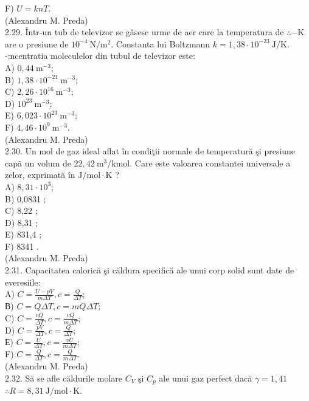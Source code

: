 F) $U=k n T$.\\
(Alexandru M. Preda)\\
2.29. Într-un tub de televizor se gǎsesc urme de aer care la temperatura de $\therefore-\mathrm{K}$ are o presiune de $10^{-4} \mathrm{~N} / \mathrm{m}^{2}$. Constanta lui Boltzmann $k=1,38 \cdot 10^{-23} \mathrm{~J} / \mathrm{K}$. -:ncentratia moleculelor din tubul de televizor este:\\
A) $0,44 \mathrm{~m}^{-3}$;\\
B) $1,38 \cdot 10^{-21} \mathrm{~m}^{-3}$;\\
C) $2,26 \cdot 10^{16} \mathrm{~m}^{-3}$;\\
D) $10^{23} \mathrm{~m}^{-3}$;\\
E) $6,023 \cdot 10^{23} \mathrm{~m}^{-3}$;\\
F) $4,46 \cdot 10^{9} \mathrm{~m}^{-3}$.\\
(Alexandru M. Preda)\\
2.30. Un mol de gaz ideal aflat în condiţii normale de temperatură şi presiune capã un volum de $22,42 \mathrm{~m}^{3} / \mathrm{kmol}$. Care este valoarea constantei universale a zelor, exprimată în $\mathrm{J} / \mathrm{mol} \cdot \mathrm{K}$ ?\\
A) $8,31 \cdot 10^{3}$;\\
B) 0,0831 ;\\
C) 8,22 ;\\
D) 8,31 ;\\
E) 831,4 ;\\
F) 8341 .\\
(Alexandru M. Preda)\\
2.31. Capacitatea calorică şi căldura specifică ale unui corp solid sunt date de everesiile:\\
A) $C=\frac{U-p V}{m \Delta T}, c=\frac{Q}{\Delta T}$;\\
В) $C=Q \Delta T, c=m Q \Delta T$;\\
C) $C=\frac{v Q}{\Delta T}, c=\frac{v Q}{m \Delta T}$;\\
D) $C=\frac{p V}{\Delta T}, c=\frac{Q}{\Delta T}$;\\
Е) $C=\frac{U}{\Delta T}, c=\frac{v U}{m \Delta T}$;\\
F) $C=\frac{Q}{\Delta T}, c=\frac{Q}{m \Delta T}$.\\
(Alexandru M. Preda)\\
2.32. Să se afle căldurile molare $C_{V}$ şi $C_{p}$ ale unui gaz perfect dacă $\gamma=1,41$ $\therefore R=8,31 \mathrm{~J} / \mathrm{mol} \cdot \mathrm{K}$.\\

